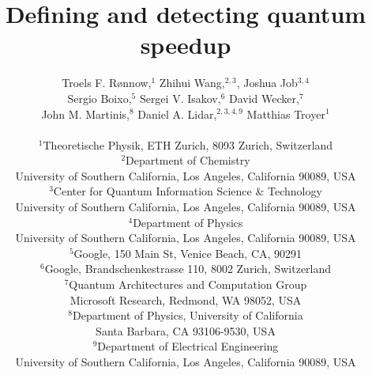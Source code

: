 \title{Defining and detecting  quantum speedup}

\author
{Troels F. R{\o}nnow,$^{1}$ Zhihui Wang,$^{2,3}$, Joshua Job$^{3,4}$ \\
 Sergio Boixo,$^{5}$  Sergei V. Isakov,$^{6}$  David Wecker,$^{7}$ \\
 John M. Martinis,$^{8}$ Daniel A. Lidar,$^{2,3,4,9}$ Matthias Troyer$^{1}$
\\
\\
\normalsize{$^{1}$Theoretische Physik, ETH Zurich, 8093 Zurich, Switzerland}\\
\normalsize{$^{2}$Department of Chemistry} \\ \normalsize{University of Southern California, Los Angeles, California 90089, USA} \\
\normalsize{$^{3}$Center for Quantum Information Science \& Technology} \\ \normalsize{University of Southern California, Los Angeles, California 90089, USA} \\
\normalsize{$^{4}$Department of Physics} \\ \normalsize{University of Southern California, Los Angeles, California 90089, USA} \\
\normalsize{$^{5}$Google, 150 Main St, Venice Beach, CA, 90291} \\ 
\normalsize{$^{6}$Google, Brandschenkestrasse 110, 8002 Zurich, Switzerland} \\
\normalsize{$^{7}$Quantum Architectures and Computation Group} \\ \normalsize {Microsoft Research, Redmond, WA 98052, USA} \\
\normalsize{$^{8}$Department of Physics, University of California} \\ \normalsize{ Santa Barbara, CA 93106-9530, USA} \\
\normalsize{$^{9}$Department of Electrical Engineering} \\ \normalsize{University of Southern California, Los Angeles, California 90089, USA} \\
}



\maketitle
\eject
